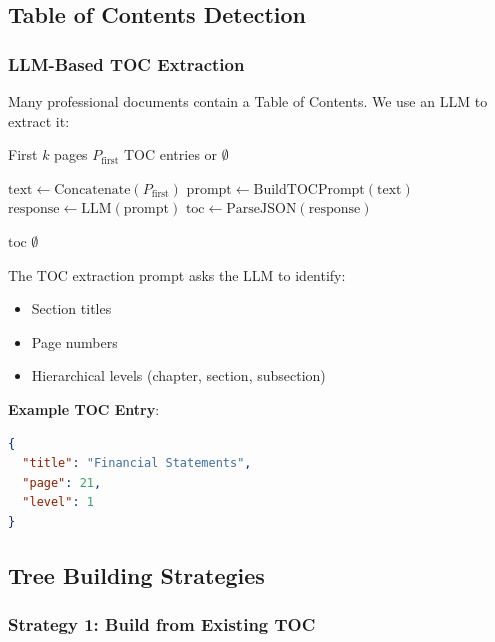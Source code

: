 \documentclass[12pt,a4paper]{article}
\begin{document}
\subsection{Table of Contents Detection}

\subsubsection{LLM-Based TOC Extraction}

Many professional documents contain a Table of Contents. We use an LLM to extract it:

\begin{algorithm}[H]
\caption{Extract Table of Contents}
\begin{algorithmic}[1]
\Require First $k$ pages $P_{\text{first}}$
\Ensure TOC entries or $\emptyset$

\State $\text{text} \gets \text{Concatenate}(P_{\text{first}})$
\State $\text{prompt} \gets \text{BuildTOCPrompt}(\text{text})$
\State $\text{response} \gets \text{LLM}(\text{prompt})$
\State $\text{toc} \gets \text{ParseJSON}(\text{response})$

    \State \Return $\text{toc}$
\Else
    \State \Return $\emptyset$
\EndIf
\end{algorithmic}
\end{algorithm}

The TOC extraction prompt asks the LLM to identify:
\begin{itemize}
    \item Section titles
    \item Page numbers
    \item Hierarchical levels (chapter, section, subsection)
\end{itemize}

\textbf{Example TOC Entry}:
\begin{lstlisting}[language=json]
{
  "title": "Financial Statements",
  "page": 21,
  "level": 1
}
\end{lstlisting}

\subsection{Tree Building Strategies}

\subsubsection{Strategy 1: Build from Existing TOC}
\end{document}
